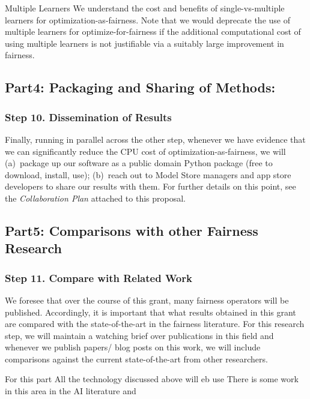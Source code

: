 \begin{success}{Multiple Learners}
We understand the cost and benefits of single-vs-multiple learners for
optimization-as-fairness. 
 Note that we would deprecate the use of multiple learners for optimize-for-fairness
 if the additional computational cost of using multiple learners is not justifiable
 via a suitably large improvement in fairness.  
\end{success}

\subsection{Part4: Packaging and Sharing of Methods:}
 
\subsubsection{ Step 10. Dissemination of Results}\label{tion:package}

Finally, running in parallel across the other step,
whenever we have evidence that we can significantly reduce
the CPU cost of optimization-as-fairness, we will (a)~package up our software as a public domain Python package (free to download, install, use); (b)~reach out to Model Store managers and app store developers to share our results with them.
For further details on this point, see the {\em Collaboration Plan} attached
to this proposal.

\subsection{Part5: Comparisons with other Fairness Research} 
\subsubsection{ Step 11. Compare with Related Work}\label{tion:package}

We foresee that over the course of this grant, many fairness operators will be published.  Accordingly, it is important that what results obtained in this grant are compared with the state-of-the-art in the fairness literature.
For this research step, we will maintain a watching brief over publications
in this field and whenever we publish papers/ blog posts on this work,
we will include comparisons against the current state-of-the-art from other
researchers.

 
 \newpage
 
 
For this part
\ei
All the technology discussed above will eb use
There is some work in this area in the AI literature and 

